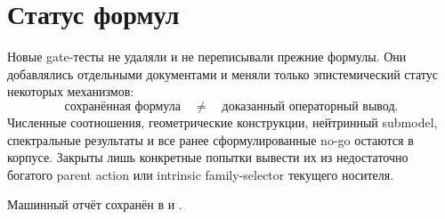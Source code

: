 \documentclass[12pt,a4paper]{article}
\begin{document}
\section{Статус формул}

Новые gate-тесты не удаляли и не переписывали прежние формулы. Они добавлялись
отдельными документами и меняли только эпистемический статус некоторых
механизмов:
\begin{equation}
 \text{сохранённая формула}
 \quad\neq\quad
 \text{доказанный операторный вывод}.
\end{equation}
Численные соотношения, геометрические конструкции, нейтринный submodel,
спектральные результаты и все ранее сформулированные no-go остаются в корпусе.
Закрыты лишь конкретные попытки вывести их из недостаточно богатого parent
action или intrinsic family-selector текущего носителя.

Машинный отчёт сохранён в
 и
.
\end{document}
